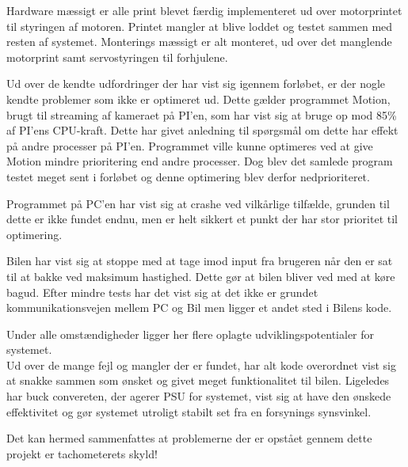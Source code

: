 Hardware mæssigt er alle print blevet færdig implementeret ud over motorprintet til styringen af motoren. Printet mangler at blive loddet og testet sammen med resten af systemet.
Monterings mæssigt er alt monteret, ud over det manglende motorprint samt servostyringen til forhjulene.

Ud over de kendte udfordringer der har vist sig igennem forløbet, er der nogle kendte problemer som ikke er optimeret ud. Dette gælder programmet Motion, brugt til streaming af kameraet på PI'en, som har vist sig at bruge op mod 85\% af PI'ens CPU-kraft. Dette har givet anledning til spørgsmål om dette har effekt på andre processer på PI'en. Programmet ville kunne optimeres ved at give Motion mindre prioritering end andre processer. Dog blev det samlede program testet meget sent i forløbet og denne optimering blev derfor nedprioriteret.

Programmet på PC'en har vist sig at crashe ved vilkårlige tilfælde, grunden til dette er ikke fundet endnu, men er helt sikkert et punkt der har stor prioritet til optimering.

Bilen har vist sig at stoppe med at tage imod input fra brugeren når den er sat til at bakke ved maksimum hastighed. Dette gør at bilen bliver ved med at køre bagud. Efter mindre tests har det vist sig at det ikke er grundet kommunikationsvejen mellem PC og Bil men ligger et andet sted i Bilens kode.

Under alle omstændigheder ligger her flere oplagte udviklingspotentialer for systemet.\\

Ud over de mange fejl og mangler der er fundet, har alt kode overordnet vist sig at snakke sammen som ønsket og givet meget funktionalitet til bilen.
Ligeledes har buck convereten, der agerer PSU for systemet, vist sig at have den ønskede effektivitet og gør systemet utroligt stabilt set fra en forsynings synsvinkel.


Det kan hermed sammenfattes at problemerne der er opstået gennem dette projekt er tachometerets skyld!


